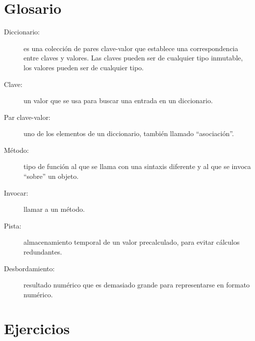 \section{Glosario}
\begin{description}
\item [{Diccionario:}] es una colección de pares clave-valor que establece
una correspondencia entre claves y valores. Las claves pueden ser
de cualquier tipo inmutable, los valores pueden ser de cualquier tipo.
\item [{Clave:}] un valor que se usa para buscar una entrada en un diccionario.
\item [{Par clave-valor:}] uno de los elementos de un diccionario, también
llamado ``asociación''.
\item [{Método:}] tipo de función al que se llama con una sintaxis diferente
y al que se invoca ``sobre'' un objeto.
\item [{Invocar:}] llamar a un método.
\item [{Pista:}] almacenamiento temporal de un valor precalculado, para
evitar cálculos redundantes.
\item [{Desbordamiento:}] resultado numérico que es demasiado grande para
representarse en formato numérico.

   
 
\end{description}

\section{Ejercicios}


